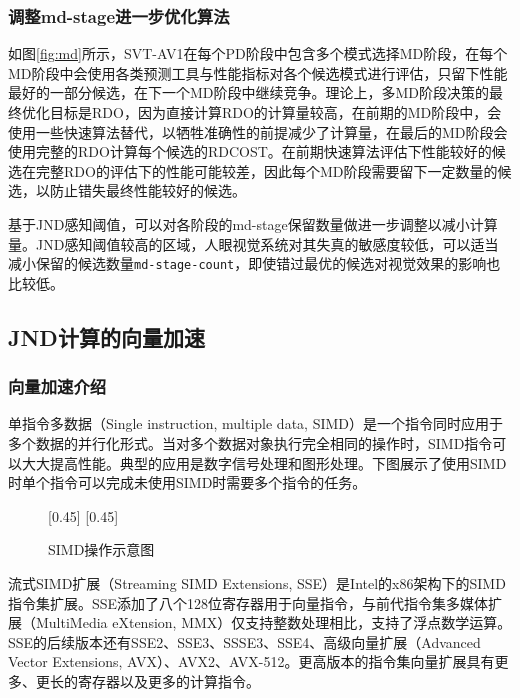   \subsubsection{调整md-stage进一步优化算法}
  如图\ref{fig:md}所示，SVT-AV1在每个PD阶段中包含多个模式选择MD阶段，在每个MD阶段中会使用各类预测工具与性能指标对各个候选模式进行评估，只留下性能最好的一部分候选，在下一个MD阶段中继续竞争。理论上，多MD阶段决策的最终优化目标是RDO，因为直接计算RDO的计算量较高，在前期的MD阶段中，会使用一些快速算法替代，以牺牲准确性的前提减少了计算量，在最后的MD阶段会使用完整的RDO计算每个候选的RDCOST。在前期快速算法评估下性能较好的候选在完整RDO的评估下的性能可能较差，因此每个MD阶段需要留下一定数量的候选，以防止错失最终性能较好的候选。

  基于JND感知阈值，可以对各阶段的md-stage保留数量做进一步调整以减小计算量。JND感知阈值较高的区域，人眼视觉系统对其失真的敏感度较低，可以适当减小保留的候选数量\texttt{md-stage-count}，即使错过最优的候选对视觉效果的影响也比较低。


  \subsection{JND计算的向量加速}

	\subsubsection{向量加速介绍}
	单指令多数据（Single instruction, multiple data, SIMD）是一个指令同时应用于多个数据的并行化形式。当对多个数据对象执行完全相同的操作时，SIMD指令可以大大提高性能。典型的应用是数字信号处理和图形处理。下图展示了使用SIMD时单个指令可以完成未使用SIMD时需要多个指令的任务。

	\begin{figure}[!hbtp]
		\centering
		[0.45\textwidth]{\resizebox{0.45\textwidth}{!}{}\label{fig:simd1}}
		 \hspace{0.7cm}
		[0.45\textwidth]{\resizebox{0.45\textwidth}{!}{}\label{fig:simd2}}
		\caption{SIMD操作示意图}
		\label{fig:simd}
	\end{figure}
	流式SIMD扩展（Streaming SIMD Extensions, SSE）是Intel的x86架构下的SIMD指令集扩展。SSE添加了八个128位寄存器用于向量指令，与前代指令集多媒体扩展（MultiMedia eXtension, MMX）仅支持整数处理相比，支持了浮点数学运算。SSE的后续版本还有SSE2、SSE3、SSSE3、SSE4、高级向量扩展（Advanced Vector Extensions, AVX）、AVX2、AVX-512。更高版本的指令集向量扩展具有更多、更长的寄存器以及更多的计算指令。

